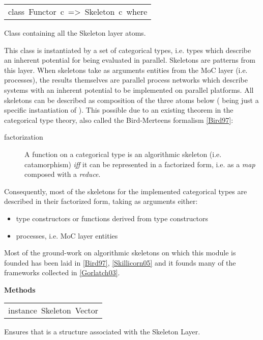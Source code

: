 \begin{haddockdesc}
\item[\begin{tabular}{@{}l}
class\ Functor\ c\ =>\ Skeleton\ c\ where
\end{tabular}]\haddockbegindoc
Class containing all the Skeleton layer atoms.\par
This class is instantiated by a set of categorical types,
 i.e. types which describe an inherent potential for being evaluated
 in parallel. Skeletons are patterns from this layer. When skeletons
 take as arguments entities from the MoC layer (i.e. processes), the
 results themselves are parallel process networks which describe
 systems with an inherent potential to be implemented on parallel
 platforms. All skeletons can be described as composition of the
 three atoms below (\haddockid{=<<=} being just a specific instantiation of
 ). This possible due to an existing theorem in the categorical
 type theory, also called the Bird-Merteens formalism
 \href{ForSyDe-Atom.html#bird97}{[Bird97]}:\par
\par
\begin{description}
\item[factorization] A function on a categorical type is an algorithmic
 skeleton (i.e. catamorphism) \emph{iff} it can be represented in a
 factorized form, i.e. as a \emph{map} composed with a \emph{reduce}.
\end{description}Consequently, most of the skeletons for the implemented categorical
 types are described in their factorized form, taking as arguments
 either:\par
                 \begin{itemize}
                 \item
                 type constructors or functions derived from type constructors\par
                 
                 \item
                 processes, i.e. MoC layer entities\par
                 
                 \end{itemize}
                 Most of the ground-work on algorithmic skeletons on which this
 module is founded has been laid in \href{ForSyDe-Atom.html#bird97}{[Bird97]},
 \href{ForSyDe-Atom.html#skillicorn05}{[Skillicorn05]} and it founds many
 of the frameworks collected in \href{ForSyDe-Atom.html#gorlatch03}{[Gorlatch03]}.\par
                 
\haddockpremethods{}\textbf{Methods}
\end{haddockdesc}
\begin{haddockdesc}
\item[\begin{tabular}{@{}l}
instance\ Skeleton\ Vector
\end{tabular}]\haddockbegindoc
Ensures that  is a structure associated with the Skeleton Layer.\par

\end{haddockdesc}
